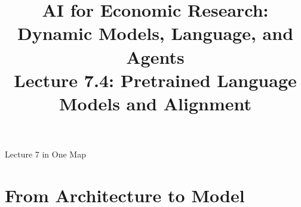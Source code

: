 



\graphicspath{{./pic/}{../../MiniCourse_8hr/Slides/Module3_LLM_Text/pic/}{../}}

\usetikzlibrary{arrows.meta, positioning, shapes.geometric, fit, backgrounds}



\title[AI for Econ Research]{AI for Economic Research: Dynamic Models, Language, and Agents\\
Lecture 7.4: Pretrained Language Models and Alignment}



\makebeamertitle

\begin{frame}{Lecture 7 in One Map}
\end{frame}

\section{From Architecture to Model}

